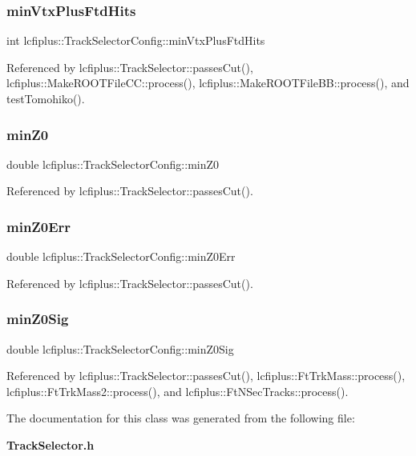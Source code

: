 \subsubsection{min\+Vtx\+Plus\+Ftd\+Hits}
{\footnotesize\ttfamily int lcfiplus\+::\+Track\+Selector\+Config\+::min\+Vtx\+Plus\+Ftd\+Hits}



Referenced by lcfiplus\+::\+Track\+Selector\+::passes\+Cut(), lcfiplus\+::\+Make\+R\+O\+O\+T\+File\+C\+C\+::process(), lcfiplus\+::\+Make\+R\+O\+O\+T\+File\+B\+B\+::process(), and test\+Tomohiko().

\mbox{\label{classlcfiplus_1_1TrackSelectorConfig_af1228f415212ab9e317e0f23165e94d0}} 
\subsubsection{min\+Z0}
{\footnotesize\ttfamily double lcfiplus\+::\+Track\+Selector\+Config\+::min\+Z0}



Referenced by lcfiplus\+::\+Track\+Selector\+::passes\+Cut().

\mbox{\label{classlcfiplus_1_1TrackSelectorConfig_aa3341c758d1f1bfef8af3a7fc4dc123c}} 
\subsubsection{min\+Z0\+Err}
{\footnotesize\ttfamily double lcfiplus\+::\+Track\+Selector\+Config\+::min\+Z0\+Err}



Referenced by lcfiplus\+::\+Track\+Selector\+::passes\+Cut().

\mbox{\label{classlcfiplus_1_1TrackSelectorConfig_a936f9c85d1c2ca111e8f5231f49f5bf8}} 
\subsubsection{min\+Z0\+Sig}
{\footnotesize\ttfamily double lcfiplus\+::\+Track\+Selector\+Config\+::min\+Z0\+Sig}



Referenced by lcfiplus\+::\+Track\+Selector\+::passes\+Cut(), lcfiplus\+::\+Ft\+Trk\+Mass\+::process(), lcfiplus\+::\+Ft\+Trk\+Mass2\+::process(), and lcfiplus\+::\+Ft\+N\+Sec\+Tracks\+::process().



The documentation for this class was generated from the following file\+:\begin{DoxyCompactItemize}
\item 
\textbf{ Track\+Selector.\+h}\end{DoxyCompactItemize}
